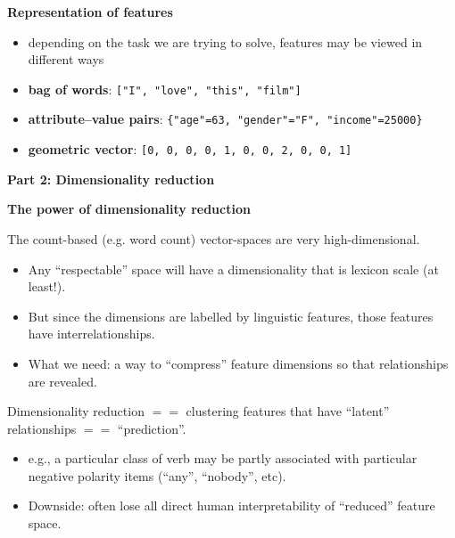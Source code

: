 \documentclass{beamer}
\newcommand{\remph}[1]{\textbf{\color{red} #1}}
\newcommand{\placard}[1]{
  \begin{frame}
    \begin{center}
      \huge
      \textbf{#1}
    \end{center}
  \end{frame}
}
\newcommand{\pagestepalt}[2]{
  \begin{frame}[t]
    \begin{minipage}[t][0.26\textheight][t]{\textwidth}
      \begin{center}
        \huge
        \textbf{#1}
      \end{center}
    \end{minipage}
    
    \begin{minipage}[t][0.7\textheight][c]{\textwidth}
      #2
    \end{minipage}
  \end{frame}
}
\begin{document}
\pagestepalt{Representation of features}{

\begin{itemize}
  \item depending on the task we are trying to solve, features may be
    viewed in different ways\pause
  \item \remph{bag of words}: \texttt{["I", "love", "this", "film"]} \pause
  \item \remph{attribute--value pairs}: \texttt{\{"age"=63, "gender"="F", "income"=25000\}}\pause
  \item \remph{geometric vector}: \texttt{[0, 0, 0, 0, 1, 0, 0, 2, 0,
      0, 1]}

\end{itemize}

}

\placard{Part 2: Dimensionality reduction}




\pagestepalt{The power of dimensionality reduction}{
  The count-based (e.g. word count)  vector-spaces are very high-dimensional.\pause
  \begin{itemize}
  \item Any ``respectable'' space will have a dimensionality that is 
    lexicon scale (at least!). \pause
  \item But since the dimensions are labelled by linguistic features, 
    those features have interrelationships. \pause  
  \item What we need: a way to ``compress'' feature dimensions so that
    relationships are revealed.\pause
  \end{itemize}
  Dimensionality reduction $==$ clustering features that have
  ``latent'' relationships $==$ ``prediction''.\pause
  \begin{itemize}
  \item e.g., a particular class of verb may be partly associated with 
    particular negative polarity items (``any'', ``nobody'', etc).\pause  
  \item Downside: often lose all direct human interpretability of
    ``reduced'' feature space.
  \end{itemize}
}
\end{document}
